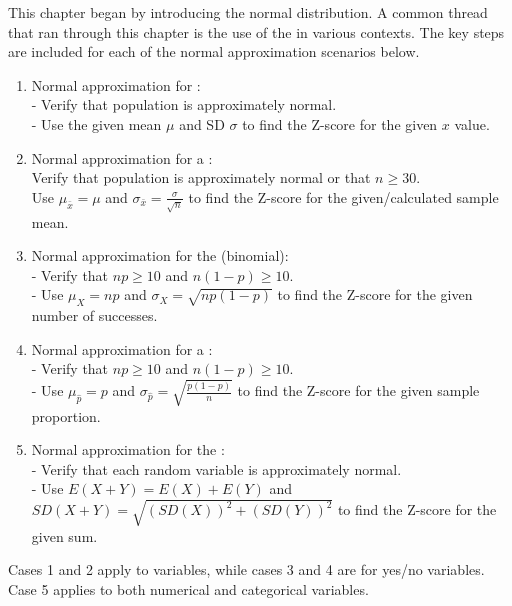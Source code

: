 {}



\reviewchapterheader{}

\noindent This chapter began by introducing the normal distribution.  A common thread that ran through this chapter is the use of the  in various contexts.  
The key steps are included for each of the normal approximation scenarios below.

\begin{enumerate}
\item Normal approximation for :  
\\- Verify that population is approximately normal.
\\- Use the given mean $\mu$ and SD $\sigma$ to find the Z-score for the given $x$ value.
\item Normal approximation for a :  
\\Verify that population is approximately normal or that $n\ge 30$.
\\Use $\mu_{\bar{x}}=\mu$ and $\sigma_{\bar{x}}=\frac{\sigma}{\sqrt{n}}$ to find the Z-score for the given/calculated sample mean.
\item Normal approximation for the  (binomial):  
\\- Verify that $np\ge 10$ and $n(1-p)\ge 10$.
\\- Use $\mu_{\scriptscriptstyle{X}} = np$ and $\sigma_{\scriptscriptstyle{X}} = \sqrt{np(1-p)}$ to find the Z-score for the given number of successes.  
\item Normal approximation for a :  
\\- Verify that $np\ge 10$ and $n(1-p)\ge 10$.
\\- Use $\mu_{\hat{p}} = p$ and $\sigma_{\hat{p}} = \sqrt{\frac{p(1-p)}{n}}$ to find the Z-score for the given sample proportion.
\item Normal approximation for the :
\\- Verify that each random variable is approximately normal.
\\- Use $E(X+Y)=E(X)+E(Y)$ and $SD(X+Y)=\sqrt{(SD(X))^2+(SD(Y))^2}$ to find the Z-score for the given sum.
\end{enumerate}
Cases 1 and 2 apply to  variables, while cases 3 and 4 are for  yes/no variables.  Case 5 applies to both numerical and categorical variables.

